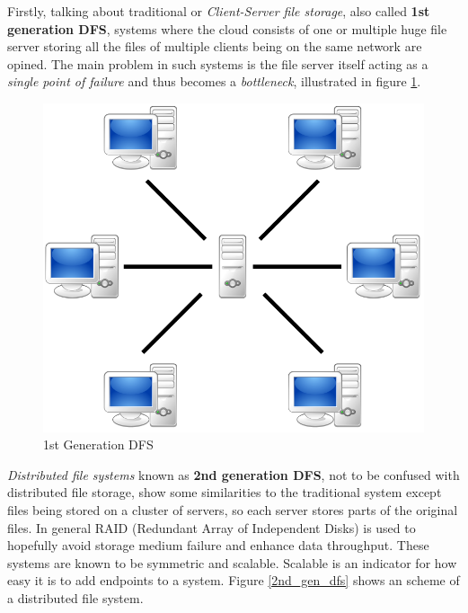 Firstly, talking about traditional or \textit{Client-Server file storage}, also called \textbf{1st generation DFS}, systems where the cloud consists of one or multiple huge file server storing all the files of multiple clients being on the same network are opined. The main problem in such systems is the file server itself acting as a \textit{single point of failure} and thus becomes a \textit{bottleneck}, illustrated in figure \ref{1st_gen_dfs}.
	\begin{figure}[H]
		\begin{center}
		\includegraphics[scale=0.25]{Talk5/1st_gen_dfs.PNG}
		\end{center}
		\caption{1st Generation DFS \cite{wikimedia:p2p}}
		\label{1st_gen_dfs}
	\end{figure}
\textit{Distributed file systems} known as \textbf{2nd generation DFS}, not to be confused with distributed file storage, show some similarities to the traditional system except files being stored on a cluster of servers, so each server stores parts of the original files. In general RAID (Redundant Array of Independent Disks) is used to hopefully avoid storage medium failure and enhance data throughput. These systems are known to be symmetric and scalable. Scalable is an indicator for how easy it is to add endpoints to a system. Figure \ref{2nd_gen_dfs} shows an scheme of a distributed file system.
